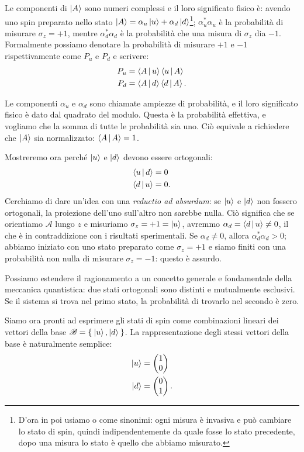 Le componenti di $\Ket{A}$ sono numeri complessi e il loro significato fisico è: avendo uno spin preparato nello stato $\Ket{A} = \alpha_u \Ket{u} + \alpha_d\Ket{d}$\footnote{D'ora in poi usiamo  o  come sinonimi: ogni misura è invasiva e può cambiare lo stato di spin, quindi indipendentemente da quale fosse lo stato precedente, dopo una misura lo stato è quello che abbiamo misurato.}; $\alpha_u^*\alpha_u$ è la probabilità di misurare $\sigma_z = +1$, mentre $\alpha_d^*\alpha_d$ è la probabilità che una misura di $\sigma_z$ dia $-1$. Formalmente possiamo denotare la probabilità di misurare $+1$ e $-1$ rispettivamente come $P_u$ e $P_d$ e scrivere:
\begin{align}
	\label{eqn:prob_state}
	P_u &= \Braket{A|u}\Braket{u|A} \notag\\ 
	P_d &= \Braket{A|d}\Braket{d|A}.
\end{align}

Le componenti $\alpha_u$ e $\alpha_d$ sono chiamate ampiezze di probabilità, e il loro significato fisico è dato dal quadrato del modulo. Questa è la probabilità effettiva, e vogliamo che la somma di tutte le probabilità sia uno. Ciò equivale a richiedere che $\Ket{A}$ sia normalizzato: $\Braket{A|A} = 1$.

Mostreremo ora perché $\Ket{u}$ e $\Ket{d}$ devono essere ortogonali:
\begin{align*}
	\Braket{u|d}&= 0\\
	\Braket{d|u}&= 0.
\end{align*}
Cerchiamo di dare un'idea con una \textit{reductio ad absurdum}: se $\Ket{u}$ e $\Ket{d}$ non fossero ortogonali, la proiezione dell'uno sull'altro non sarebbe nulla. Ciò significa che se orientiamo $\mathcal{A}$ lungo $z$ e misuriamo $\sigma_z = +1 = \Ket{u}$, avremmo $\alpha_d = \Braket{d|u} \neq 0$, il che è in contraddizione con i risultati sperimentali. Se $\alpha_d \neq 0$, allora $\alpha_d^*\alpha_d > 0$; abbiamo iniziato con uno stato preparato come $\sigma_z = +1$ e siamo finiti con una probabilità non nulla di misurare $\sigma_z = -1$: questo è assurdo.

Possiamo  estendere il ragionamento a un concetto generale e fondamentale della meccanica quantistica: due stati ortogonali sono distinti e mutualmente esclusivi. Se il sistema si trova nel primo stato, la probabilità di trovarlo nel secondo è zero.

Siamo ora pronti ad esprimere gli stati di spin come combinazioni lineari dei vettori della base $\mathscr{B} = \Set{\Ket{u}, \Ket{d}}$. La rappresentazione degli stessi vettori della base è naturalmente semplice:
\begin{align}
	\Ket{u} &= \begin{pmatrix}
		1 \\
		0
	\end{pmatrix}
	\label{eqn:ket_u}\\
	\Ket{d} &= \begin{pmatrix}
		0 \\
		1
	\end{pmatrix}.
	\label{eqn:ket_d}
\end{align}

